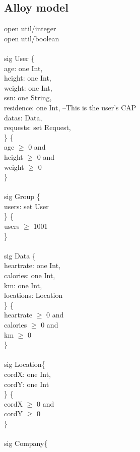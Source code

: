 \documentclass{article}
\begin{document}
\subsection{Alloy model}
open util/integer \\ 
open util/boolean \\
\\
 sig User \{  \\
 age: one Int, \\ 
 height: one Int, \\ 
 weight: one Int, \\
 ssn: one String, \\ 
 residence: one Int, --This is the user's CAP \\ 
 datas: Data, \\
 requests: set Request,  \\
 \}   \{ \\
 age $\geq$ 0 and \\ 
 height $\geq$ 0 and  \\ 
 weight $\geq$ 0 \\ 
 \} \\
 \\
sig Group \{\\
users: set User\\
\} \{ \\users $\geq$ 1001\\ \}\\
\\
sig Data \{\\
heartrate: one Int,\\
calories: one Int,\\
km: one Int,\\
locations: Location\\
\} \{\\
heartrate $\geq$ 0 and\\
calories $\geq$ 0 and\\
km $\geq$ 0\\
\}\\
\\
sig Location\{\\
cordX: one Int,\\
cordY: one Int\\
\} \{\\
cordX $\geq$ 0 and\\
cordY $\geq$ 0\\
\}\\
\\
sig Company\{\\
\end{document}
